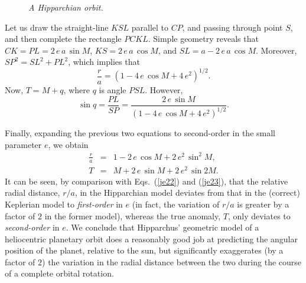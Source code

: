\begin{figure}[h]
\epsfysize=3in
\centerline{}
\caption{\em A Hipparchian orbit.}\label{hipp}
\end{figure}

Let us draw the straight-line $KSL$ parallel to $CP$, and passing through point $S$, and then complete the rectangle $PCKL$. Simple geometry reveals that 
$CK = PL = 2\,e\,a\,\sin M$, $KS=2\,e\,a\,\cos M$, and  $SL = a-2\,e\,a\,\cos M$. Moreover, $SP^2 = SL^2+ PL^2$,
which implies that
\begin{equation}
\frac{r}{a} = (1-4\,e\,\cos M + 4\,e^2)^{1/2}.
\end{equation}
Now, $T = M + q$, where $q$ is angle $PSL$. However,
\begin{equation}
\sin q = \frac{PL}{SP} = \frac{2\,e\,\sin M}{(1-4\,e\,\cos M + 4\,e^2)^{1/2}}.
\end{equation}

Finally, expanding the previous two equations to second-order in the small parameter $e$, we obtain
\begin{eqnarray}\label{e4.26}
\frac{r}{a} &=& 1 -2\,e\,\cos M + 2\,e^2\,\sin^2 M,\\[0.5ex]
T &=& M + 2\,e\,\sin M + 2\,e^2\,\sin 2M.\label{e4.27}
\end{eqnarray}
It can be seen, by comparison with Eqs.~(\ref{je22}) and (\ref{je23}), that   the relative radial distance, $r/a$, in the Hipparchian model deviates from that in the (correct) Keplerian model to {\em first-order}\/ in $e$ (in fact, the variation of $r/a$
is greater by a factor of $2$ in the former model), whereas 
 the true anomaly, $T$,  only deviates  to {\em second-order}\/ in $e$.  We conclude that  Hipparchus' geometric model
 of a heliocentric planetary orbit does a
 reasonably good job at predicting the angular position of the planet, relative to the sun, but significantly
 exaggerates (by a factor of $2$) the variation in the radial distance between the two during the course of a complete  orbital rotation. 

